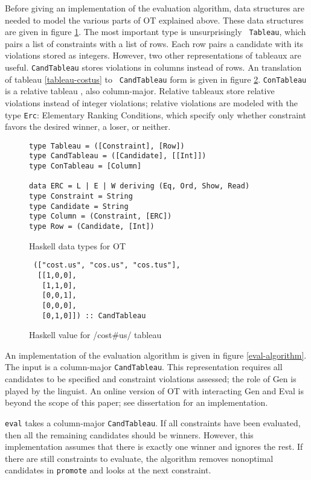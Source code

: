 \documentclass[11pt]{article}
\begin{document}
Before giving an implementation of the evaluation algorithm, data
structures are needed to model the various parts of OT explained
above. These data structures are given in figure
\ref{haskell-types}. The most important type is unsurprisingly {\tt
  Tableau}, which pairs a list of constraints with a list of
rows. Each row pairs a candidate with its violations stored as
integers. However, two other representations of tableaux are
useful. {\tt CandTableau} stores violations in columns instead of
rows. An translation of tableau \ref{tableau-costus} to {\tt
  CandTableau} form is given in figure \ref{haskell-costus}.
{\tt ConTableau} is a relative tableau \cite{prince02}, also
column-major. Relative tableaux store relative violations instead of
integer violations; relative violations are modeled with the type
{\tt Erc}: Elementary Ranking Conditions, which specify only whether
constraint favors the desired winner, a loser, or neither.

\begin{figure}
\begin{verbatim}
type Tableau = ([Constraint], [Row])
type CandTableau = ([Candidate], [[Int]])
type ConTableau = [Column]

data ERC = L | E | W deriving (Eq, Ord, Show, Read)
type Constraint = String
type Candidate = String
type Column = (Constraint, [ERC])
type Row = (Candidate, [Int])
\end{verbatim}

  \caption{Haskell data types for OT}
  \label{haskell-types}
\end{figure}

\begin{figure}
  \begin{verbatim}
 (["cost.us", "cos.us", "cos.tus"],
  [[1,0,0],
   [1,1,0],
   [0,0,1],
   [0,0,0],
   [0,1,0]]) :: CandTableau
\end{verbatim}
  \caption{Haskell value for /cost\#us/ tableau}
  \label{haskell-costus}
\end{figure}

An implementation of the evaluation algorithm is given in figure
\ref{eval-algorithm}. The input is a column-major {\tt CandTableau}.
This representation requires all candidates to be
specified and constraint violations assessed; the role of {\sc Gen} is
played by the linguist. An online version of OT with interacting {\sc
  Gen} and {\sc Eval} is beyond the scope of this paper; see
 dissertation for an implementation.

{\tt eval} takes a column-major {\tt CandTableau}. If all
constraints have been evaluated, then all the remaining candidates should
be winners. However, this implementation assumes that there is exactly one winner and
ignores the rest. If there are still constraints to evaluate, the
algorithm removes nonoptimal candidates in {\tt promote} and looks at the
next constraint.
\end{document}
